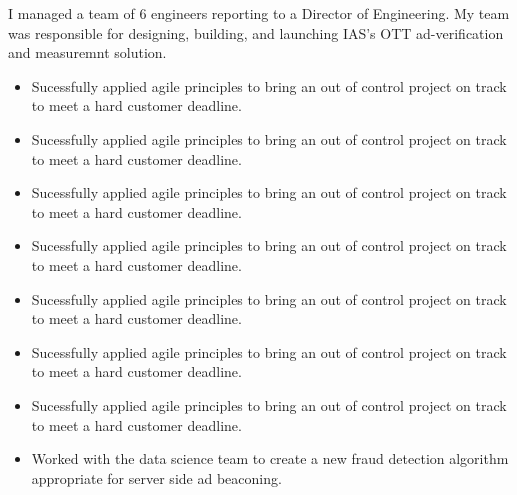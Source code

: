 \documentclass[12t]{article}
\begin{document}
\vspace{3pt} I managed a team of 6 engineers reporting to a Director of Engineering. My team was responsible for designing, building, and
launching IAS's OTT ad-verification and measuremnt solution. 
\begin{multicols}{2}
  \begin{small}
    \begin{itemize}[leftmargin=*,label=\tiny{$\bullet$}]
    \item\begin{minipage}[t]{\linewidth}{Sucessfully applied agile principles to bring an out of control project on track to meet a hard customer deadline.}\end{minipage}
    \item\begin{minipage}[t]{\linewidth}{Sucessfully applied agile principles to bring an out of control project on track to meet a hard customer deadline.}\end{minipage}
    \item\begin{minipage}[t]{\linewidth}{Sucessfully applied agile principles to bring an out of control project on track to meet a hard customer deadline.}\end{minipage}
    \item\begin{minipage}[t]{\linewidth}{Sucessfully applied agile principles to bring an out of control project on track to meet a hard customer deadline.}\end{minipage}
    \item\begin{minipage}[t]{\linewidth}{Sucessfully applied agile principles to bring an out of control project on track to meet a hard customer deadline.}\end{minipage}
    \item\begin{minipage}[t]{\linewidth}{Sucessfully applied agile principles to bring an out of control project on track to meet a hard customer deadline.}\end{minipage}
    \item\begin{minipage}[t]{\linewidth}{Sucessfully applied agile principles to bring an out of control project on track to meet a hard customer deadline.}\end{minipage}
    \item\begin{minipage}[t]{\linewidth}{Worked with the data science team to create a new fraud detection algorithm appropriate for server side ad beaconing.}\end{minipage}

\end{itemize}
\end{small}
\end{multicols}
\end{document}
